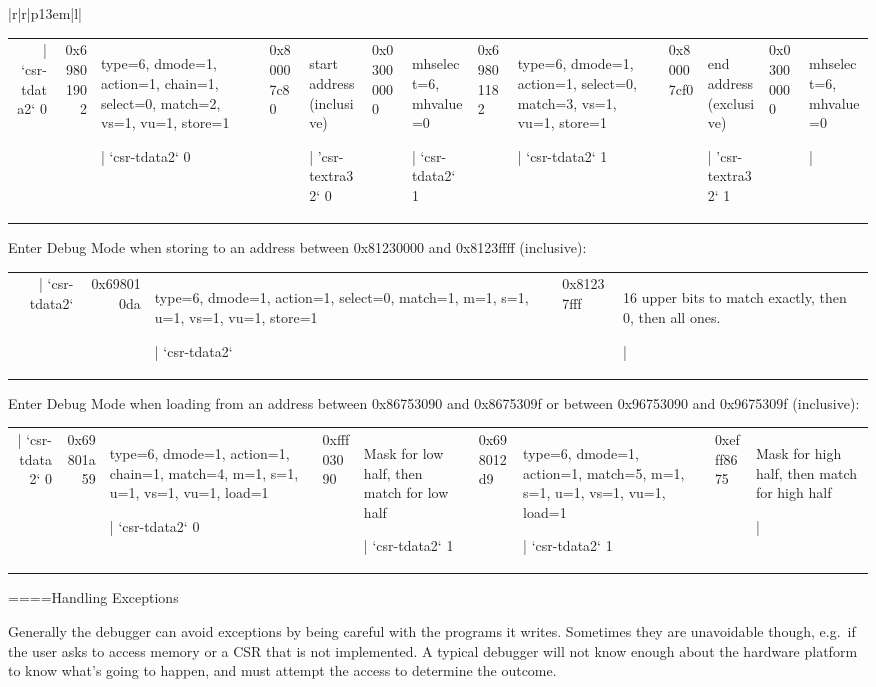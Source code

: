\begin{tabular}{|r|r|p{13em}|l|}
\begin{tabulary}{\textwidth}{|r|r|L|}
|
    `csr-tdata2` 0 & 0x69801902 & type=6, dmode=1, action=1, chain=1, select=0, match=2, vs=1, vu=1, store=1 
    
|
    `csr-tdata2` 0 & 0x80007c80 & start address (inclusive) 
    
|
    'csr-textra32` 0 & 0x03000000 & mhselect=6, mhvalue=0 
    
|
    `csr-tdata2` 1 & 0x69801182 & type=6, dmode=1, action=1, select=0, match=3, vs=1, vu=1, store=1 
    
|
    `csr-tdata2` 1 & 0x80007cf0 & end address (exclusive) 
    
|
    'csr-textra32` 1 & 0x03000000 & mhselect=6, mhvalue=0 
    
|
\end{tabulary}


 Enter Debug Mode when storing to an address between
0x81230000 and 0x8123ffff (inclusive):

\begin{tabulary}{\textwidth}{|r|r|L|}
    
|
    `csr-tdata2` & 0x698010da & type=6, dmode=1, action=1, select=0, match=1, m=1, s=1, u=1, vs=1, vu=1, store=1 
    
|
    `csr-tdata2` & 0x81237fff & 16 upper bits to match exactly, then 0, then all ones. 
    
|
\end{tabulary}


 Enter Debug Mode when loading from an address between
0x86753090 and 0x8675309f or between 0x96753090 and 0x9675309f (inclusive):

\begin{tabulary}{\textwidth}{|r|r|L|}
    
|
    `csr-tdata2` 0 & 0x69801a59 & type=6, dmode=1, action=1, chain=1, match=4, m=1, s=1, u=1, vs=1, vu=1, load=1 
    
|
    `csr-tdata2` 0 & 0xfff03090 & Mask for low half, then match for low half 
    
|
    `csr-tdata2` 1 & 0x698012d9 & type=6, dmode=1, action=1, match=5, m=1, s=1, u=1, vs=1, vu=1, load=1 
    
|
    `csr-tdata2` 1 & 0xefff8675 & Mask for high half, then match for high half 
    
|
\end{tabulary}


===={Handling Exceptions}

Generally the debugger can avoid exceptions by being careful with the programs
it writes. Sometimes they are unavoidable though, e.g.\ if the user asks to
access memory or a CSR that is not implemented. A typical debugger will not
know enough about the hardware platform to know what's going to happen, and must attempt
the access to determine the outcome.


\end{tabular}

